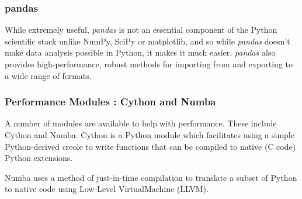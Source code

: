 \documentclass[MASTER.tex]{subfiles}
\begin{document}
\begin{frame}
	\frametitle{pandas}	
	While extremely useful, \textit{pandas} is not an essential component of the Python scientific stack unlike NumPy, SciPy or matplotlib, and so while \textit{pandas} doesn’t
	make data analysis possible in Python, it makes it much easier. \textit{pandas} also provides high-performance,
	robust methods for importing from and exporting to a wide range of formats.
\end{frame}
\begin{frame}
	
\frametitle{Performance Modules : Cython and Numba}
A number of modules are available to help with performance. These include Cython and Numba. Cython
is a Python module which facilitates using a simple Python-derived creole to write functions that can be
compiled to native (C code) Python extensions. 

Numba uses a method of just-in-time compilation to
translate a subset of Python to native code using Low-Level VirtualMachine (LLVM).
\end{frame}
\end{document}
